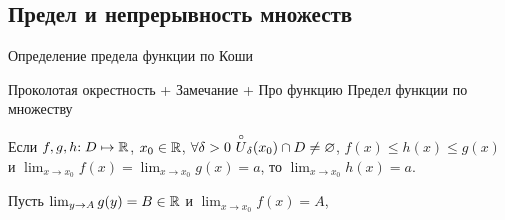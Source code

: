 \subsection{Предел и непрерывность множеств}


Определение предела функции по Коши

Проколотая окрестность
+ Замечание
+ Про функцию
Предел функции по множеству




\begin{theorem}
	Если $f, g, h{:}\; D \mapsto \mathbb{R}$, $x_0 \in \mathbb{R}$, $\forall \delta > 0\ \overset{\circ}{U}_\delta(x_0) \cap D \ne \varnothing$, $f(x) \le h(x) \le g(x)$ и $\lim_{x \to x_0} f(x) = \lim_{x \to x_0} g(x) = a$, то $\lim_{x \to x_0} h(x) = a$.
\end{theorem}

Пусть $\lim_{y \to A} g(y) = B \in \mathbb{R}$ и $\lim_{x \to x_0} f(x) = A$, 


